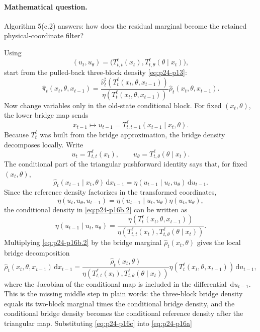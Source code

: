 \documentclass[11pt]{article}
\newcommand{\dd}{\,\mathrm d}
\begin{document}
\paragraph{Mathematical question.}
Algorithm 5(c.2) answers: how does the residual marginal become the retained
physical-coordinate filter?

Using
\[
    (u_t,u_\theta)
    =
    \bigl(
    T_{t,t}^{\ell}(x_t),
    T_{t,\theta}^{\ell}(\theta\mid x_t)
    \bigr),
    \label{eq:p24-p16}
\]
start from the pulled-back three-block density \eqref{eq:p24-p13}:
\[
    \widehat\pi_t(x_t,\theta,x_{t-1})
    =
    \frac{
    \widehat\nu_t^\sharp(T_t^\ell(x_t,\theta,x_{t-1}))}
    {\eta(T_t^\ell(x_t,\theta,x_{t-1}))}
    \widehat\rho_t(x_t,\theta,x_{t-1}).
    \label{eq:p24-p16a}
\]
Now change variables only in the old-state conditional block.  For fixed
\((x_t,\theta)\), the lower bridge map sends
\[
    x_{t-1}
    \mapsto
    u_{t-1}
    =
    T_{t,t-1}^{\ell}(x_{t-1}\mid x_t,\theta).
    \label{eq:p24-p16b}
\]
Because \(T_t^\ell\) was built from the bridge approximation, the bridge
density decomposes locally.  Write
\[
    u_t=T_{t,t}^{\ell}(x_t),\qquad
    u_\theta=T_{t,\theta}^{\ell}(\theta\mid x_t).
    \label{eq:p24-p16b.1}
\]
The conditional part of the triangular pushforward identity says that, for
fixed \((x_t,\theta)\),
\[
    \widehat\rho_t(x_{t-1}\mid x_t,\theta)\dd x_{t-1}
    =
    \eta(u_{t-1}\mid u_t,u_\theta)\dd u_{t-1}.
    \label{eq:p24-p16b.2}
\]
Since the reference density factorizes in the transformed coordinates,
\[
    \eta(u_t,u_\theta,u_{t-1})
    =
    \eta(u_{t-1}\mid u_t,u_\theta)\eta(u_t,u_\theta),
    \label{eq:p24-p16b.3}
\]
the conditional density in \eqref{eq:p24-p16b.2} can be written as
\[
    \eta(u_{t-1}\mid u_t,u_\theta)
    =
    \frac{\eta(T_t^\ell(x_t,\theta,x_{t-1}))}
    {\eta(T_{t,t}^{\ell}(x_t),T_{t,\theta}^{\ell}(\theta\mid x_t))}.
    \label{eq:p24-p16b.4}
\]
Multiplying \eqref{eq:p24-p16b.2} by the bridge marginal
\(\widehat\rho_t(x_t,\theta)\) gives the local bridge decomposition
\[
    \widehat\rho_t(x_t,\theta,x_{t-1})\dd x_{t-1}
    =
    \frac{
    \widehat\rho_t(x_t,\theta)}
    {\eta(T_{t,t}^{\ell}(x_t),T_{t,\theta}^{\ell}(\theta\mid x_t))}
    \eta(T_t^\ell(x_t,\theta,x_{t-1}))\dd u_{t-1},
    \label{eq:p24-p16c}
\]
where the Jacobian of the conditional map is included in the differential
\(\dd u_{t-1}\).  This is the missing middle step in plain words: the
three-block bridge density equals its two-block marginal times the conditional
bridge density, and the conditional bridge density becomes the conditional
reference density after the triangular map.  Substituting \eqref{eq:p24-p16c} into \eqref{eq:p24-p16a}
\end{document}

